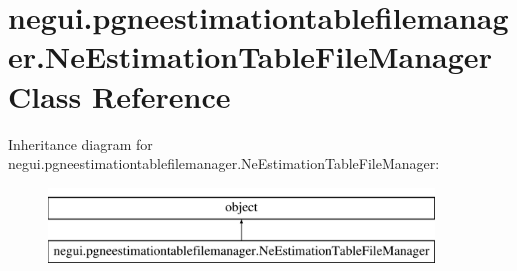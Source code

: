 \hypertarget{classnegui_1_1pgneestimationtablefilemanager_1_1NeEstimationTableFileManager}{}\section{negui.\+pgneestimationtablefilemanager.\+Ne\+Estimation\+Table\+File\+Manager Class Reference}
\label{classnegui_1_1pgneestimationtablefilemanager_1_1NeEstimationTableFileManager}
Inheritance diagram for negui.\+pgneestimationtablefilemanager.\+Ne\+Estimation\+Table\+File\+Manager\+:\begin{figure}[H]
\begin{center}
\leavevmode
\includegraphics[height=2.000000cm]{classnegui_1_1pgneestimationtablefilemanager_1_1NeEstimationTableFileManager}
\end{center}
\end{figure}
